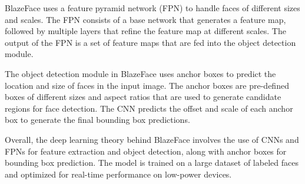 \documentclass[journal]{IEEEtran}
\begin{document}
BlazeFace uses a feature pyramid network (FPN) to handle faces of different sizes and scales. The FPN consists of a base network that generates a feature map, followed by multiple layers that refine the feature map at different scales. The output of the FPN is a set of feature maps that are fed into the object detection module.

The object detection module in BlazeFace uses anchor boxes to predict the location and size of faces in the input image. The anchor boxes are pre-defined boxes of different sizes and aspect ratios that are used to generate candidate regions for face detection. The CNN predicts the offset and scale of each anchor box to generate the final bounding box predictions.

Overall, the deep learning theory behind BlazeFace involves the use of CNNs and FPNs for feature extraction and object detection, along with anchor boxes for bounding box prediction. The model is trained on a large dataset of labeled faces and optimized for real-time performance on low-power devices.
\end{document}
